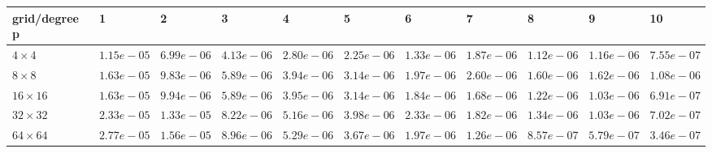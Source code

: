 \begin{tabular}{lllllllllll}
\hline
 grid/degree p   & 1          & 2          & 3          & 4          & 5          & 6          & 7          & 8          & 9          & 10         \\
\hline
 $4 \times 4$    & $1.15e-05$ & $6.99e-06$ & $4.13e-06$ & $2.80e-06$ & $2.25e-06$ & $1.33e-06$ & $1.87e-06$ & $1.12e-06$ & $1.16e-06$ & $7.55e-07$ \\
 $8 \times 8$    & $1.63e-05$ & $9.83e-06$ & $5.89e-06$ & $3.94e-06$ & $3.14e-06$ & $1.97e-06$ & $2.60e-06$ & $1.60e-06$ & $1.62e-06$ & $1.08e-06$ \\
 $16 \times 16$  & $1.63e-05$ & $9.94e-06$ & $5.89e-06$ & $3.95e-06$ & $3.14e-06$ & $1.84e-06$ & $1.68e-06$ & $1.22e-06$ & $1.03e-06$ & $6.91e-07$ \\
 $32 \times 32$  & $2.33e-05$ & $1.33e-05$ & $8.22e-06$ & $5.16e-06$ & $3.98e-06$ & $2.33e-06$ & $1.82e-06$ & $1.34e-06$ & $1.03e-06$ & $7.02e-07$ \\
 $64 \times 64$  & $2.77e-05$ & $1.56e-05$ & $8.96e-06$ & $5.29e-06$ & $3.67e-06$ & $1.97e-06$ & $1.26e-06$ & $8.57e-07$ & $5.79e-07$ & $3.46e-07$ \\
\hline
\end{tabular}